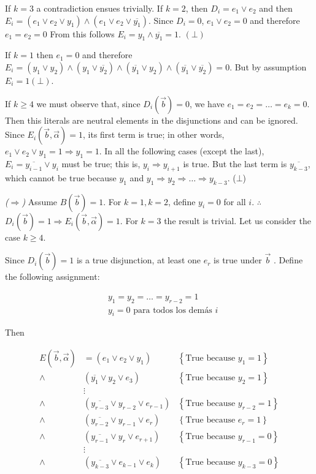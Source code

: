\documentclass[a4paper, 12pt]{article}
\begin{document}
If $k = 3$ a contradiction ensues trivially. If $k = 2$, then $D_i = e_1 \lor
e_2$ and then $E_i = (e_1 \lor  e_2 \lor y_1) \land  (e_1 \lor  e_2 \lor
\overline{y_1})$. Since $D_i = 0$, $e_1 \lor  e_2 = 0$ and therefore $e_1 = e_2
= 0$ From this follows  $E_i = y_1 \land \overline{y_1} = 1$. $(\bot)$

If $k = 1$ then $e_1 = 0$ and therefore $E_i = (y_1 \lor  y_2) \land  (y_1 \lor
\overline{y_2}) \land  (\overline{y_1} \lor  y_2) \land  (\overline{y_1} \lor
\overline{y_2}) = 0$. But by assumption $E_i = 1 (\bot)$.

If $k\geq 4$ we must observe that, since $D_i(\overrightarrow{b}) =
0$, we have $e_1 = e_2 = \ldots = e_k = 0$. Then this literals 
are neutral elements in the disjunctions and can be ignored.
Since $E_i(\overrightarrow{b}, \overrightarrow{\alpha}) = 1$, its first term 
is true; in other words, $e_1 \lor  e_2 \lor  y_1 = 1
\Rightarrow y_1 = 1$. In all the following cases (except the last),
$E_i = \overline{y_{i-1}} \lor  y_i$ must be true; this is,
$y_i \Rightarrow y_{i+1}$ is true. But the last term is $\overline{y_{k-3}}$,
which cannot be true because $y_1$ and $ y_1 \Rightarrow y_2 \Rightarrow \ldots
\Rightarrow y_{k-3}$. ($\bot$)

\textit{($\Rightarrow$)} Assume $B(\overrightarrow{b}) = 1$. For $k = 1, k = 2$, define 
$y_i = 0$ for all $i$. $\therefore $ $D_i(\overrightarrow{b}) = 1 \Rightarrow
E_i(\overrightarrow{b}, \overrightarrow{\alpha}) = 1$. For $k = 3$ the result 
is trivial. Let us consider the case $k \geq 4$.

Since $D_i(\overrightarrow{b}) = 1$ is a true disjunction, at least one $e_r$
is true under $\overrightarrow{b}$ . Define the following assignment:

\begin{align*}
    &y_1 = y_2 = \ldots = y_{r-2} = 1 \\ 
    &y_i = 0 \text{ para todos los demás $i$}
\end{align*}

Then

\begin{align*}
    E(\overrightarrow{b}, \overrightarrow{\alpha}) &= \left( e_1 \lor e_2 \lor y_1 \right) &\left\{ \text{True because } y_1 = 1 \right\}  \\ 
    \land &\left( \overline{y_1} \lor  y_2 \lor  e_3 \right) &\left\{ \text{True because } y_2 = 1 \right\}  \\ 
          &\vdots& \\ 
    \land &(\overline{y_{r-3}} \lor  y_{r-2} \lor  e_{r-1}) &\left\{ \text{True because } y_{r-2} = 1 \right\}  \\ 
    \land&(\overline{y_{r-2}} \lor  y_{r-1} \lor  e_r) &\left\{ \text{True because } e_{r} = 1 \right\}  \\ 
    \land&(\overline{y_{r-1}} \lor y_{r} \lor  e_{r+1}) &\left\{ \text{True because } y_{r-1} = 0 \right\}  \\ 
         &\vdots &\\ 
    \land &(\overline{y_{k-3}} \lor e_{k-1} \lor  e_k) &\left\{ \text{True because } y_{k-3} = 0 \right\} 
\end{align*}
\end{document}
